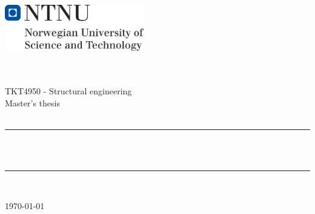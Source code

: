 \begin{titlepage}
\begin{center}
\includegraphics[height=2cm]{0_Images/NTNU_hovedlogo_eng.png}\\[1cm]   
\end{center}
\begin{center}

 ~\\[1.5cm]

\textsc{\Large }\\[0.5cm] TKT4950 - Structural engineering \\ Master's thesis\\

 ~\\[.1cm]

\hrule ~\\[0.4cm]
{\huge \bfseries \mytitle}~\\[0.4cm]
\hrule ~\\[1.5cm]

\begin{minipage}{0.4\textwidth}
    \centering
	\large
	\myauthor
\end{minipage}

\vfill

{\large \today}

\end{center}
\end{titlepage}
